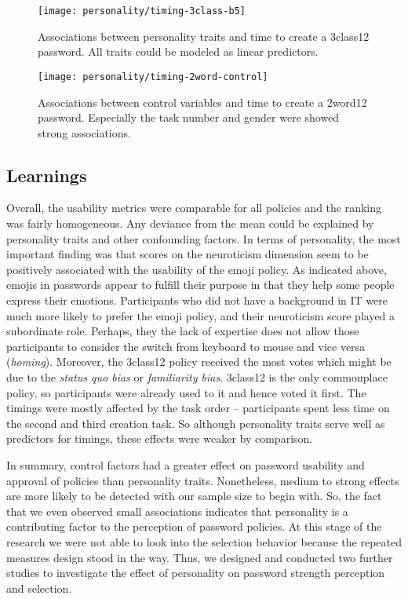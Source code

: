 \begin{figure}
	\texttt{[image: personality/timing-3class-b5]}
	\caption{\label{fig:personality:timing-3class-b5}Associations between personality traits and time to create a 3class12 password. All traits could be modeled as linear predictors.}
\end{figure}

\begin{figure}
	\texttt{[image: personality/timing-2word-control]}
	\caption{\label{fig:personality:timing-2word-control}Associations between control variables and time to create a 2word12 password. Especially the task number and gender were showed strong associations.}
\end{figure}



\subsection{Learnings}
Overall, the usability metrics were comparable for all policies and the ranking was fairly homogeneous. Any deviance from the mean could be explained by personality traits and other confounding factors. In terms of personality, the most important finding was that scores on the neuroticism dimension seem to be positively associated with the usability of the emoji policy. As indicated above, emojis in passwords appear to fulfill their purpose in that they help some people express their emotions. Participants who did not have a background in IT were much more likely to prefer the emoji policy, and their neuroticism score played a subordinate role. Perhaps, they the lack of expertise does not allow those participants to consider the switch from keyboard to mouse and vice versa (\textit{homing}). Moreover, the 3class12 policy received the most votes which might be due to the \textit{status quo bias} or \textit{familiarity bias}. 3class12 is the only commonplace policy, so participants were already used to it and hence voted it first. The timings were mostly affected by the task order -- participants spent less time on the second and third creation task. So although personality traits serve well as predictors for timings, these effects were weaker by comparison. 

In summary, control factors had a greater effect on password usability and approval of policies than personality traits. Nonetheless, medium to strong effects are more likely to be detected with our sample size to begin with. So, the fact that we even observed small associations indicates that personality is a contributing factor to the perception of password policies. At this stage of the research we were not able to look into the selection behavior because the repeated measures design stood in the way. Thus, we designed and conducted two further studies to investigate the effect of personality on password strength perception and selection. 

